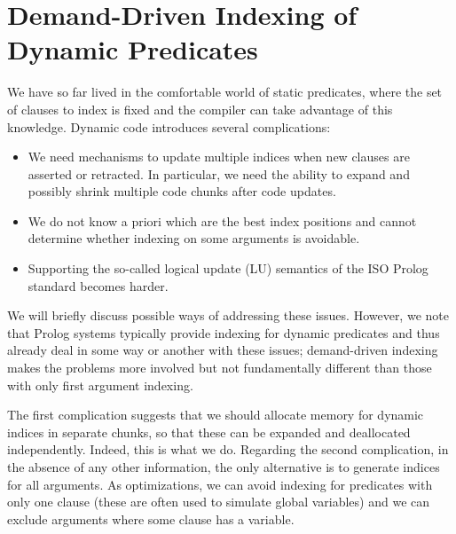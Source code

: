 \documentclass{llncs}
\newcommand{\JITI}{demand-driven indexing\xspace}
\begin{document}
\section{Demand-Driven Indexing of Dynamic Predicates} \label{sec:dynamic}
We have so far lived in the comfortable world of static predicates,
where the set of clauses to index is fixed and the compiler can take
advantage of this knowledge. Dynamic code introduces several
complications:
\begin{itemize}
\item We need mechanisms to update multiple indices when new clauses
  are asserted or retracted. In particular, we need the ability to
  expand and possibly shrink multiple code chunks after code updates.
\item We do not know a priori which are the best index positions and
  cannot determine whether indexing on some arguments is avoidable.
\item Supporting the so-called logical update (LU) semantics of the
  ISO Prolog standard becomes harder.
\end{itemize}
We will briefly discuss possible ways of addressing these issues.
However, we note that Prolog systems typically provide indexing for
dynamic predicates and thus already deal in some way or another with
these issues; \JITI makes the problems more involved but not
fundamentally different than those with only first argument indexing.

The first complication suggests that we should allocate memory for
dynamic indices in separate chunks, so that these can be expanded and
deallocated independently. Indeed, this is what we do.
%
Regarding the second complication, in the absence of any other
information, the only alternative is to generate indices for all
arguments. As optimizations, we can avoid indexing for predicates with
only one clause (these are often used to simulate global variables)
and we can exclude arguments where some clause has a variable.
\end{document}
